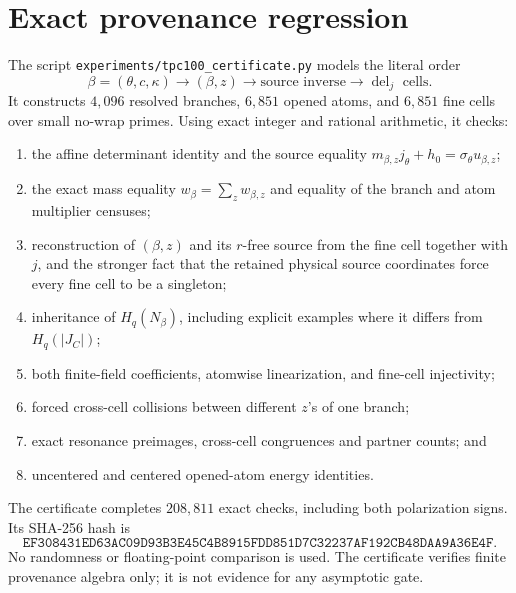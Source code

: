 \section{Exact provenance regression}
\label{sec:regression}

The script
\texttt{experiments/tpc100\_certificate.py} models the literal order
\[
 \beta=(\theta,c,\kappa)
 \longrightarrow
 (\beta,z)
 \longrightarrow
 \text{source inverse}
 \longrightarrow
 \operatorname{del}_j\text{ cells}.
\]
It constructs \(4{,}096\) resolved branches,
\(6{,}851\) opened atoms, and \(6{,}851\) fine cells over small
no-wrap primes.  Using exact integer and rational arithmetic, it
checks:
\begin{enumerate}[leftmargin=2em]
\item the affine determinant identity and the source equality
  \(m_{\beta,z}j_\theta+h_0=\sigma_\theta u_{\beta,z}\);
\item the exact mass equality
  \(w_\beta=\sum_z w_{\beta,z}\) and equality of the branch and atom
  multiplier censuses;
\item reconstruction of \((\beta,z)\) and its \(r\)-free source from
  the fine cell together with \(j\), and the stronger fact that the
  retained physical source coordinates force every fine cell to be
  a singleton;
\item inheritance of \(H_q(N_\beta)\), including explicit examples
  where it differs from \(H_q(|J_C|)\);
\item both finite-field coefficients, atomwise linearization, and
  fine-cell injectivity;
\item forced cross-cell collisions between different \(z\)'s of one
  branch;
\item exact resonance preimages, cross-cell congruences and partner
  counts; and
\item uncentered and centered opened-atom energy identities.
\end{enumerate}
The certificate completes \(208{,}811\) exact checks, including both
polarization signs.  Its SHA-256
hash is
\[
\texttt{EF308431ED63AC09D93B3E45C4B8915FDD851D7C32237AF192CB48DAA9A36E4F}.
\]
No randomness or floating-point comparison is used.  The
certificate verifies finite provenance algebra only; it is not
evidence for any asymptotic gate.
